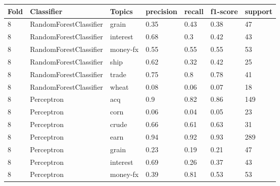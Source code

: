 \documentclass{article}
\begin{document}
\begin{table}[h]
\begin{tabular}{lllllll}
\textbf{Fold} & \textbf{Classifier}    & \textbf{Topics} & \textbf{precision} & \textbf{recall} & \textbf{f1-score} & \textbf{support} \\ \hline
8             & RandomForestClassifier & grain           & 0.35               & 0.43            & 0.38              & 47               \\
8             & RandomForestClassifier & interest        & 0.68               & 0.3             & 0.42              & 43               \\
8             & RandomForestClassifier & money-fx        & 0.55               & 0.55            & 0.55              & 53               \\
8             & RandomForestClassifier & ship            & 0.62               & 0.32            & 0.42              & 25               \\
8             & RandomForestClassifier & trade           & 0.75               & 0.8             & 0.78              & 41               \\
8             & RandomForestClassifier & wheat           & 0.08               & 0.06            & 0.07              & 18               \\
8             & Perceptron             & acq             & 0.9                & 0.82            & 0.86              & 149              \\
8             & Perceptron             & corn            & 0.06               & 0.04            & 0.05              & 23               \\
8             & Perceptron             & crude           & 0.66               & 0.61            & 0.63              & 31               \\
8             & Perceptron             & earn            & 0.94               & 0.92            & 0.93              & 289              \\
8             & Perceptron             & grain           & 0.23               & 0.19            & 0.21              & 47               \\
8             & Perceptron             & interest        & 0.69               & 0.26            & 0.37              & 43               \\
8             & Perceptron             & money-fx        & 0.39               & 0.81            & 0.53              & 53               \\

\end{tabular}
\end{table}
\end{document}
